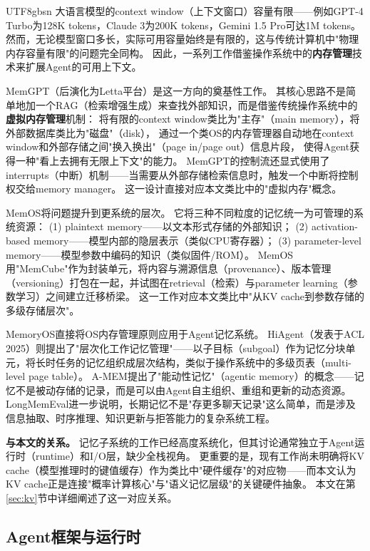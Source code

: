 \documentclass[11pt,a4paper]{article}
\begin{document}
\begin{CJK*}{UTF8}{gbsn}
大语言模型的context window（上下文窗口）容量有限——例如GPT-4 Turbo为128K tokens，Claude 3为200K tokens，Gemini 1.5 Pro可达1M tokens\cite{gemini2024}。
然而，无论模型窗口多长，实际可用容量始终是有限的，这与传统计算机中"物理内存容量有限"的问题完全同构。
因此，一系列工作借鉴操作系统中的\textbf{内存管理}技术来扩展Agent的可用上下文。

MemGPT\cite{memgpt2023}（后演化为Letta平台）是这一方向的奠基性工作。
其核心思路不是简单地加一个RAG（检索增强生成）\cite{lewis2020rag}来查找外部知识，而是借鉴传统操作系统中的\textbf{虚拟内存管理}机制：
将有限的context window类比为"主存"（main memory），将外部数据库类比为"磁盘"（disk），
通过一个类OS的内存管理器自动地在context window和外部存储之间"换入换出"（page in/page out）信息片段，
使得Agent获得一种"看上去拥有无限上下文"的能力。
MemGPT的控制流还显式使用了interrupts（中断）机制——当需要从外部存储检索信息时，触发一个中断将控制权交给memory manager。
这一设计直接对应本文类比中的"虚拟内存"概念。

MemOS\cite{memos2025}将问题提升到更系统的层次。
它将三种不同粒度的记忆统一为可管理的系统资源：
(1) plaintext memory——以文本形式存储的外部知识；
(2) activation-based memory——模型内部的隐层表示（类似CPU寄存器）；
(3) parameter-level memory——模型参数中编码的知识（类似固件/ROM）。
MemOS用"MemCube"作为封装单元，将内容与溯源信息（provenance）、版本管理（versioning）打包在一起，并试图在retrieval（检索）与parameter learning（参数学习）之间建立迁移桥梁。
这一工作对应本文类比中"从KV cache到参数存储的多级存储层次"。

MemoryOS\cite{memoryos2025}直接将OS内存管理原则应用于Agent记忆系统。
HiAgent\cite{hiagent2024}（发表于ACL 2025）则提出了"层次化工作记忆管理"——以子目标（subgoal）作为记忆分块单元，将长时任务的记忆组织成层次结构，类似于操作系统中的多级页表（multi-level page table）。
A-MEM\cite{amem2025}提出了"能动性记忆"（agentic memory）的概念——记忆不是被动存储的记录，而是可以由Agent自主组织、重组和更新的动态资源。
LongMemEval\cite{longmemeval2024}进一步说明，长期记忆不是"存更多聊天记录"这么简单，而是涉及信息抽取、时序推理、知识更新与拒答能力的复杂系统工程。

\textbf{与本文的关系。}
记忆子系统的工作已经高度系统化，但其讨论通常独立于Agent运行时（runtime）和I/O层，缺少全栈视角。
更重要的是，现有工作尚未明确将KV cache（模型推理时的键值缓存）作为类比中"硬件缓存"的对应物——而本文认为KV cache正是连接"概率计算核心"与"语义记忆层级"的关键硬件抽象。
本文在第\ref{sec:kv}节中详细阐述了这一对应关系。

\subsection{Agent框架与运行时}
\label{sec:related-agent-framework}


\end{CJK*}
\end{document}
